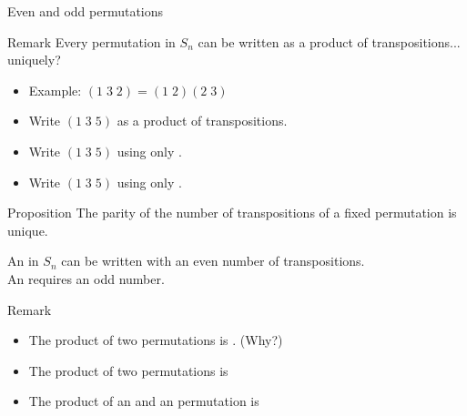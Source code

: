 \documentclass[8pt, handout]{beamer}
\newcommand{\Pause}{}      %
\begin{document}
\begin{frame}{Even and odd permutations} %
  
  \begin{exampleblock}{Remark}
    Every permutation in $S_n$ can be written as a product of transpositions... \alert{uniquely?}
  \end{exampleblock}
  
  \medskip\Pause

  \begin{itemize}
    \item Example: $(1\; 3\; 2) = (1\; 2) (2\; 3)$ \Pause
    \item Write $(1\; 3\; 5)$ as a product of transpositions. \Pause
    \item Write $(1\; 3\; 5)$ using only .
    \item Write $(1\; 3\; 5)$ using only .
  \end{itemize}
  
  \medskip\Pause
  
  \begin{block}{Proposition}
    The \alert{parity} of the number of transpositions of a fixed
    permutation is unique.
  \end{block}
  
  \Pause

  \begin{definition}
    An  in $S_n$ can be written with an even
    number of transpositions. \\
    An  requires an odd number.
  \end{definition}

  \Pause
  
  \begin{exampleblock}{Remark}
    \begin{itemize}
    \item The product of two  permutations is . (Why?) \Pause
    \item The product of two  permutations is \Pause
    \item The product of an  and an  permutation is 
    \end{itemize}
  \end{exampleblock}


\end{frame}

\end{document}
